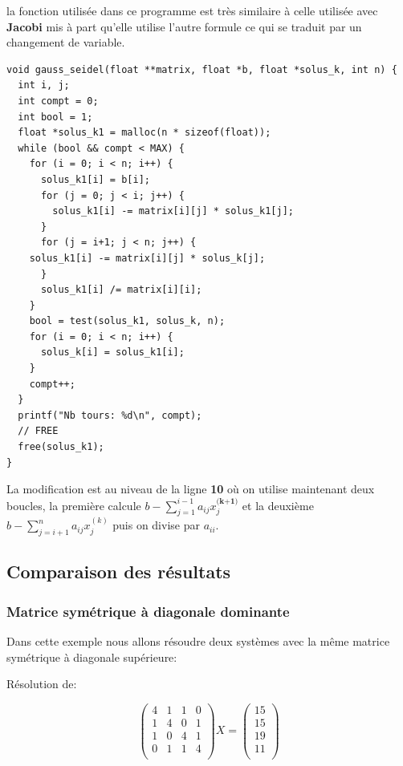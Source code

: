 \documentclass[a4paper]{article}
\begin{document}
la fonction utilisée dans ce programme est très similaire à celle utilisée avec
\textbf{Jacobi} mis à part qu'elle utilise l'autre formule ce qui se traduit
par un changement de variable.

\begin{lstlisting}
void gauss_seidel(float **matrix, float *b, float *solus_k, int n) {
  int i, j;
  int compt = 0;
  int bool = 1;
  float *solus_k1 = malloc(n * sizeof(float));
  while (bool && compt < MAX) {
    for (i = 0; i < n; i++) {
      solus_k1[i] = b[i];
      for (j = 0; j < i; j++) {
        solus_k1[i] -= matrix[i][j] * solus_k1[j];
      }
      for (j = i+1; j < n; j++) {
	solus_k1[i] -= matrix[i][j] * solus_k[j];
      }
      solus_k1[i] /= matrix[i][i];
    }
    bool = test(solus_k1, solus_k, n);
    for (i = 0; i < n; i++) {
      solus_k[i] = solus_k1[i];
    }
    compt++;
  }
  printf("Nb tours: %d\n", compt);
  // FREE
  free(solus_k1);
}
\end{lstlisting}

La modification est au niveau de la ligne \textbf{10} où on utilise maintenant
deux boucles, la première calcule $b - \sum_{j=1}^{i-1}a_{ij}x_{j}^{\textbf{(k+1)}}$
et la deuxième $b - \sum_{j=i+1}^{n}a_{ij}x_{j}^{(k)}$ puis on divise par $a_{ii}$.

\subsection{Comparaison des résultats}

\subsubsection{Matrice symétrique à diagonale dominante}

Dans cette exemple nous allons résoudre deux systèmes avec la même matrice
symétrique à diagonale supérieure:

Résolution de:

\[
\begin{pmatrix}
  4 & 1 & 1 & 0\\
  1 & 4 & 0 & 1\\
  1 & 0 & 4 & 1\\
  0 & 1 & 1 & 4\\
\end{pmatrix} X =
\begin{pmatrix}
  15\\
  15\\
  19\\
  11\\
\end{pmatrix}
\]\\
\end{document}
